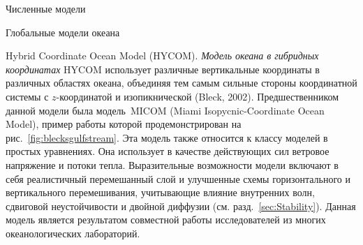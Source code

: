 \begin{chapter}{Численные модели}
\begin{section}{Глобальные модели океана}
\begin{paragraph}{Hybrid Coordinate Ocean Model (HYCOM).}
\emph{Модель океана в гибридных координатах} HYCOM
использует различные вертикальные координаты в различных областях океана,
объединяя тем самым сильные стороны координатной системы с $z$-координатой
и изопикнической (Bleck, 2002). Предшественником данной модели была модель~MICOM
(Miami Isopycnic-Coordinate Ocean Model), пример работы которой 
продемонстрирован на рис.~\ref{fig:blecksgulfstream}. Эта модель также
относится к классу моделей в простых уравнениях. Она использует в качестве
действующих сил ветровое напряжение
и потоки тепла. Выразительные возможности модели включают
в себя реалистичный перемешанный слой и улучшенные схемы горизонтального
и вертикального перемешивания, учитывающие влияние внутренних волн, сдвиговой
неустойчивости и двойной диффузии (см. разд.~\ref{sec:Stability}). Данная
модель является результатом совместной работы исследователей из многих
океанологических лабораторий.
%
\end{paragraph}



\end{section}
\end{chapter}
